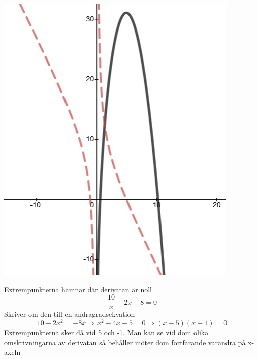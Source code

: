 \documentclass[a4paper,12pt]{article}
\begin{document}
\begin{enumerate}
    \includegraphics[scale=0.6]{Figur 2.jpg}
    
    Extrempunkterna hamnar där derivatan är noll
    $$\frac{10}{x}-2x+8=0$$
    Skriver om den till en andragradsekvation
    $$10-2x^2=-8x\Rightarrow x^2-4x-5=0\Rightarrow (x-5)(x+1)=0$$
    Extrempunkterna sker då vid 5 och -1.
    Man kan se vid dom olika omskrivningarna av derivatan
    så behåller möter dom fortfarande varandra på x-axeln


\end{enumerate}
\end{document}
